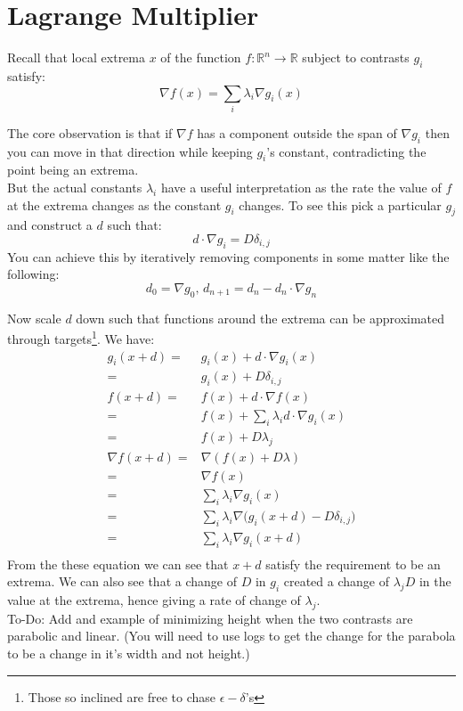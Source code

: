 
\section{Lagrange Multiplier}
Recall that local extrema $x$ of the function $f :\mathbb{R}^n \rightarrow \mathbb{R}$ subject to contrasts $g_i$ satisfy:
\[\nabla f(x) = \sum_i \lambda_i \nabla g_i(x)\]

The core observation is that if $\nabla f$ has a component outside the span of ${\nabla g_i}$ then you can move in that direction while keeping $g_i$'s constant, contradicting the point being an extrema.
\\

But the actual constants $\lambda_i$ have a useful interpretation as the rate the value of $f$ at the extrema changes as the constant $g_i$ changes.
To see this pick a particular $g_j$ and construct a $d$ such that:
\[d\cdot \nabla g_i = D\delta_{i,j}\]
You can achieve this by iteratively removing components in some matter like the following:
\[d_0 = \nabla g_0,\, d_{n+1} = d_n -d_n\cdot\nabla g_n\]

Now scale $d$ down such that functions around the extrema can be approximated through targets\footnote{Those so inclined are free to chase $\epsilon - \delta$'s}.
We have:
\begin{equation*}
	\begin{aligned}
		g_i(x+d) =& g_i(x)+d\cdot\nabla g_i(x)\\
		=& g_i(x) + D\delta_{i,j} \\
		f(x+d) =& f(x)+d\cdot\nabla f(x) \\
		=& f(x) + \sum_i \lambda_i d \cdot \nabla g_i(x) \\ 
		=& f(x) + D\lambda_j \\
		\nabla f(x+d) =& \nabla(f(x)+D\lambda) \\
		=& \nabla f(x) \\
		=& \sum_i \lambda_i \nabla g_i(x) \\
		=& \sum_i \lambda_i \nabla \big(g_i(x+d) - D\delta_{i,j}\big) \\
		=& \sum_i \lambda_i \nabla g_i(x+d)\\
	\end{aligned}
\end{equation*}
From the these equation we can see that $x+d$ satisfy the requirement to be an extrema.
We can also see that a change of $D$ in $g_i$ created a change of $\lambda_j D$ in the value at the extrema, hence giving a rate of change of $\lambda_j$.
\\

To-Do: Add and example of minimizing height when the two contrasts are parabolic and linear.
(You will need to use logs to get the change for the parabola to be a change in it's width and not height.)
